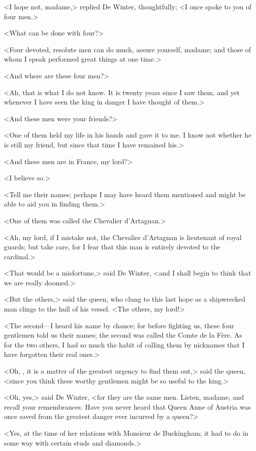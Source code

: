 <I hope not, madame,> replied De Winter, thoughtfully; <I once spoke to you of four men.>

<What can be done with four?>

<Four devoted, resolute men can do much, assure yourself, madame; and those of whom I speak performed great things at one time.>

<And where are these four men?>

<Ah, that is what I do not know. It is twenty years since I saw them, and yet whenever I have seen the king in danger I have thought of them.>

<And these men were your friends?>

<One of them held my life in his hands and gave it to me. I know not whether he is still my friend, but since that time I have remained his.>

<And these men are in France, my lord?>

<I believe so.>

<Tell me their names; perhaps I may have heard them mentioned and might be able to aid you in finding them.>

<One of them was called the Chevalier d'Artagnan.>

<Ah, my lord, if I mistake not, the Chevalier d'Artagnan is lieutenant of royal guards; but take care, for I fear that this man is entirely devoted to the cardinal.>

<That would be a misfortune,> said De Winter, <and I shall begin to think that we are really doomed.>

<But the others,> said the queen, who clung to this last hope as a shipwrecked man clings to the hull of his vessel. <The others, my lord!>

<The second—I heard his name by chance; for before fighting us, these four gentlemen told us their names; the second was called the Comte de la Fère. As for the two others, I had so much the habit of calling them by nicknames that I have forgotten their real ones.>

<Oh, , it is a matter of the greatest urgency to find them out,> said the queen, <since you think these worthy gentlemen might be so useful to the king.>

<Oh, yes,> said De Winter, <for they are the same men. Listen, madame, and recall your remembrances. Have you never heard that Queen Anne of Austria was once saved from the greatest danger ever incurred by a queen?>

<Yes, at the time of her relations with Monsieur de Buckingham; it had to do in some way with certain studs and diamonds.>

